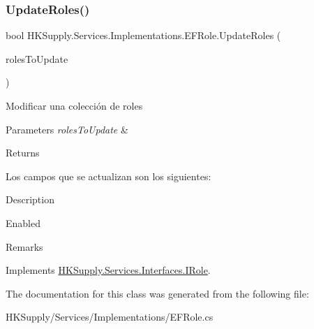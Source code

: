 \subsubsection{\texorpdfstring{Update\+Roles()}{UpdateRoles()}}
{\footnotesize\ttfamily bool H\+K\+Supply.\+Services.\+Implementations.\+E\+F\+Role.\+Update\+Roles (\begin{DoxyParamCaption}\item[{I\+Enumerable$<$ \hyperlink{class_h_k_supply_1_1_models_1_1_role}{Role} $>$}]{roles\+To\+Update }\end{DoxyParamCaption})}



Modificar una colección de roles 


\begin{DoxyParams}{Parameters}
{\em roles\+To\+Update} & \\
\hline
\end{DoxyParams}
\begin{DoxyReturn}{Returns}

\end{DoxyReturn}


Los campos que se actualizan son los siguientes\+:
\begin{DoxyItemize}
\item Description
\item Enabled
\item Remarks 
\end{DoxyItemize}

Implements \hyperlink{interface_h_k_supply_1_1_services_1_1_interfaces_1_1_i_role}{H\+K\+Supply.\+Services.\+Interfaces.\+I\+Role}.



The documentation for this class was generated from the following file\+:\begin{DoxyCompactItemize}
\item 
H\+K\+Supply/\+Services/\+Implementations/E\+F\+Role.\+cs\end{DoxyCompactItemize}

